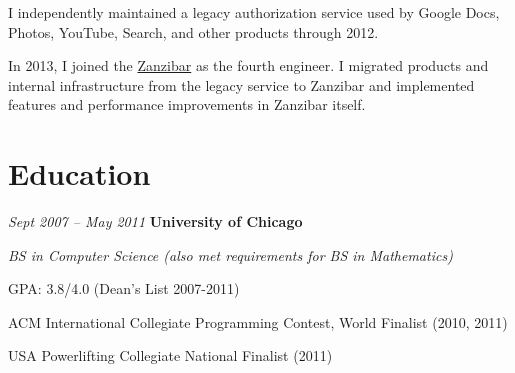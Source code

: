 \documentclass[10pt, letterpaper]{article}
\begin{document}
\vspace{0.10 cm}
\begin{onecolentry}
    \begin{highlights}
        \item I independently maintained a legacy authorization service used by Google Docs, Photos, YouTube, Search, and other products through 2012.
        \item In 2013, I joined the \href{https://research.google/pubs/zanzibar-googles-consistent-global-authorization-system/}{Zanzibar} as the fourth engineer. I migrated products and internal infrastructure from the legacy service to Zanzibar and implemented features and performance improvements in Zanzibar itself.
    \end{highlights}
\end{onecolentry}

\section{Education}

\begin{twocolentry}{
    \textit{Sept 2007 – May 2011}
}
    \textbf{University of Chicago}
\end{twocolentry}

\begin{onecolentry}
    \textit{BS in Computer Science (also met requirements for BS in Mathematics)}
\end{onecolentry}

\vspace{0.10 cm}
\begin{onecolentry}
    \begin{highlights}
        \item GPA: 3.8/4.0 (Dean's List 2007-2011)
        \item ACM International Collegiate Programming Contest, World Finalist (2010, 2011)
        \item USA Powerlifting Collegiate National Finalist (2011)
    \end{highlights}
\end{onecolentry}
\end{document}
